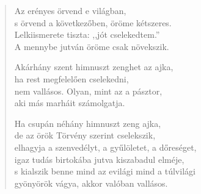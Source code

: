\begin{verse}
 Az erényes örvend e világban,\\
s örvend a következőben, öröme kétszeres.\\
Lelkiismerete tiszta: ,,jót cselekedtem.''\\
A mennybe jutván öröme csak növekszik.

 Akárhány szent himnuszt zenghet az ajka,\\
ha rest megfelelően cselekedni,\\
nem vallásos. Olyan, mint az a pásztor,\\
aki más marháit számolgatja.

 Ha csupán néhány himnuszt zeng ajka,\\
de az örök Törvény szerint cselekszik,\\
elhagyja a szenvedélyt, a gyűlöletet, a dőreséget,\\
igaz tudás birtokába jutva kiszabadul elméje,\\
s kialszik benne mind az evilági mind a túlvilági\\
gyönyörök vágya, akkor valóban vallásos.

\end{verse}
